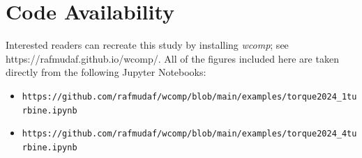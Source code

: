 \documentclass{iopconfser}
\begin{document}
\section{Code Availability}
Interested readers can recreate this study by installing \textit{wcomp}; see https://rafmudaf.github.io/wcomp/.
All of the figures included here are taken directly from the following Jupyter Notebooks:

\begin{itemize}
\item \texttt{https://github.com/rafmudaf/wcomp/blob/main/examples/torque2024\_1turbine.ipynb}

\item \texttt{https://github.com/rafmudaf/wcomp/blob/main/examples/torque2024\_4turbine.ipynb}
\end{itemize}


\end{document}
